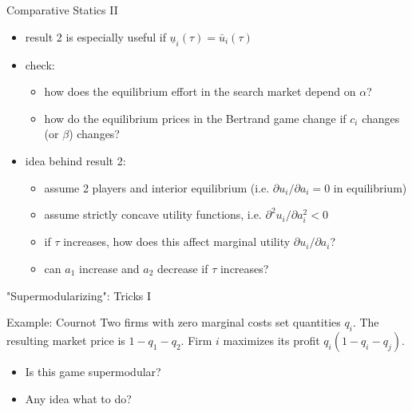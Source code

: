 \documentclass[bigger]{beamer}
\begin{document}
\begin{frame}[label={sec:orgheadline15}]{Comparative Statics II}
\begin{itemize}
\item result 2 is especially useful if \(\underline u_i(\tau)=\bar u_i(\tau)\)
\item check:
\begin{itemize}
\item how does the equilibrium effort in the search market depend on \(\alpha\)?
\item how do the equilibrium prices in the Bertrand game change if \(c_i\) changes (or \(\beta\)) changes?
\end{itemize}
\item idea behind result 2:
\begin{itemize}
\item assume 2 players and interior equilibrium (i.e. \(\partial u_i/\partial a_i=0\) in equilibrium)
\item assume strictly concave utility functions, i.e. \(\partial^2 u_i/\partial a_i^2<0\)
\item if \(\tau\) increases, how does this affect marginal utility \(\partial u_i/\partial a_i\)?
\item can \(a_1\) increase and \(a_2\) decrease if \(\tau\) increases?
\end{itemize}
\end{itemize}
\end{frame}

\begin{frame}[label={sec:orgheadline16}]{"Supermodularizing": Tricks I}
\begin{block}{Example: Cournot}
Two firms with zero marginal costs set quantities \(q_i\). The resulting market price is \(1-q_1-q_2\). Firm \(i\) maximizes its profit \(q_i(1-q_i-q_j)\).
\end{block}

\begin{itemize}
\item Is this game supermodular?
\item Any idea what to do?
\end{itemize}
\end{frame}
\end{document}
